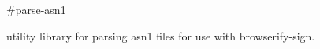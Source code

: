 \#parse-\/asn1

\href{http://travis-ci.org/crypto-browserify/parse-asn1}{\tt } \href{https://www.npmjs.org/package/parse-asn1}{\tt }

\href{https://github.com/feross/standard}{\tt }

utility library for parsing asn1 files for use with browserify-\/sign. 